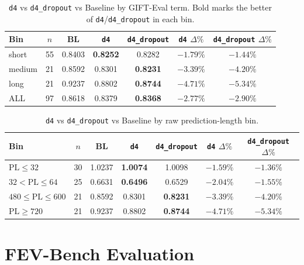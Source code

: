 \documentclass{article}
\begin{document}
\begin{table}[H]
\centering
\caption{\texttt{d4} vs \texttt{d4\_dropout} vs Baseline by GIFT-Eval term. Bold marks the better of \texttt{d4}/\texttt{d4\_dropout} in each bin.}
\small
\begin{tabular}{lcccccc}
\toprule
\textbf{Bin} & \textbf{$n$} & \textbf{BL} & \textbf{\texttt{d4}} & \textbf{\texttt{d4\_dropout}} & \textbf{\texttt{d4} $\Delta\%$} & \textbf{\texttt{d4\_dropout} $\Delta\%$} \\
\midrule
short  & 55 & 0.8403 & \textbf{0.8252} & 0.8282 & $-1.79\%$ & $-1.44\%$ \\
medium & 21 & 0.8592 & 0.8301 & \textbf{0.8231} & $-3.39\%$ & $-4.20\%$ \\
long   & 21 & 0.9237 & 0.8802 & \textbf{0.8744} & $-4.71\%$ & $-5.34\%$ \\
\midrule
ALL    & 97 & 0.8618 & 0.8379 & \textbf{0.8368} & $-2.77\%$ & $-2.90\%$ \\
\bottomrule
\end{tabular}
\end{table}

\begin{table}[H]
\centering
\caption{\texttt{d4} vs \texttt{d4\_dropout} vs Baseline by raw prediction-length bin.}
\small
\begin{tabular}{lcccccc}
\toprule
\textbf{Bin} & \textbf{$n$} & \textbf{BL} & \textbf{\texttt{d4}} & \textbf{\texttt{d4\_dropout}} & \textbf{\texttt{d4} $\Delta\%$} & \textbf{\texttt{d4\_dropout} $\Delta\%$} \\
\midrule
$\text{PL} \le 32$       & 30 & 1.0237 & \textbf{1.0074} & 1.0098 & $-1.59\%$ & $-1.36\%$ \\
$32 < \text{PL} \le 64$  & 25 & 0.6631 & \textbf{0.6496} & 0.6529 & $-2.04\%$ & $-1.55\%$ \\
$480 \le \text{PL} \le 600$ & 21 & 0.8592 & 0.8301 & \textbf{0.8231} & $-3.39\%$ & $-4.20\%$ \\
$\text{PL} \ge 720$      & 21 & 0.9237 & 0.8802 & \textbf{0.8744} & $-4.71\%$ & $-5.34\%$ \\
\bottomrule
\end{tabular}
\end{table}

\section{FEV-Bench Evaluation}
\label{app:fevbench}
\end{document}
